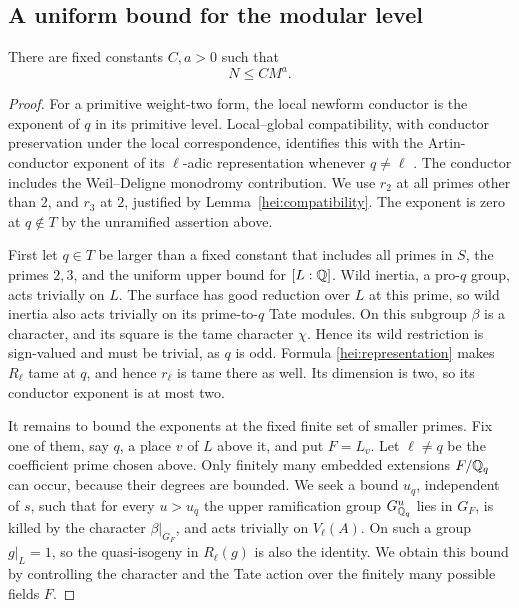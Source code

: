 \subsection{A uniform bound for the modular level}

\begin{lemma}\label{hei:level-bound}
There are fixed constants $C,a>0$ such that
\begin{equation}\label{hei:level}
                              N\le C M^a.
\end{equation}
\end{lemma}

\begin{proof}
For a primitive weight-two form, the local newform conductor is
the exponent of $q$ in its primitive level.  Local--global
compatibility, with conductor preservation under the local
correspondence, identifies this with the Artin-conductor exponent
of its $\ell$-adic representation whenever $q\ne\ell$
\cite[Theorem~A in Section~0.7, with the normalization in Section~0.5]{Carayol1986}.
The conductor includes the Weil--Deligne monodromy contribution.
We use $r_2$ at all primes other than $2$, and $r_3$ at $2$,
justified by Lemma~\ref{hei:compatibility}.  The exponent is zero at
$q\notin T$ by the unramified assertion above.

First let $q\in T$ be larger than a fixed constant that includes all
primes in $S$, the primes $2,3$, and the uniform upper bound for
$[L:\mathbb Q]$.  Wild inertia, a pro-$q$ group, acts trivially on $L$.
The surface has good reduction over $L$ at this prime, so wild
inertia also acts trivially on its prime-to-$q$ Tate modules.  On
this subgroup $\beta$ is a character, and its square is the tame
character $\chi$.  Hence its wild restriction is sign-valued and
must be trivial, as $q$ is odd.  Formula \eqref{hei:representation}
makes $R_\ell$ tame at $q$, and hence $r_\ell$ is tame there as well.
Its dimension is two, so its
conductor exponent is at most two.

It remains to bound the exponents at the fixed finite set of smaller
primes.  Fix one of them, say $q$, a place $v$ of $L$ above it, and
put $F=L_v$.  Let $\ell\ne q$ be the coefficient prime chosen above.
Only finitely many embedded extensions $F/\mathbb Q_q$ can occur, because
their degrees are bounded.  We seek a bound $u_q$, independent of
$s$, such that for every $u>u_q$ the upper ramification group
$G_{\mathbb Q_q}^u$ lies in $G_F$, is killed by the character
$\beta|_{G_F}$, and acts trivially on $V_\ell(A)$.  On such a group
$g|_L=1$, so the quasi-isogeny in $R_\ell(g)$ is also the identity.
We obtain this bound by controlling the character and the Tate action
over the finitely many possible fields $F$.


\end{proof}
